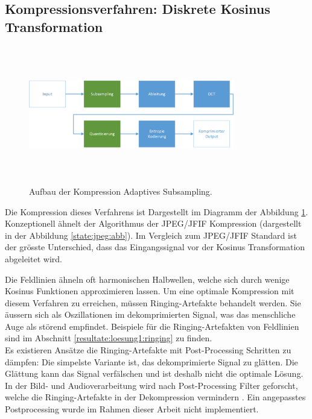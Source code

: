 \subsection{Kompressionsverfahren: Diskrete Kosinus Transformation}\label{konzept:loesung1}
\begin{figure}[!htbp]
	\center
	\includegraphics[width=0.8\textwidth,height=6cm,keepaspectratio]{./pictures/konzept/solution1/aufbau.png}
	\caption{Aufbau der Kompression Adaptives Subsampling.}
	\label{konzept:loesung1:aufbau}
\end{figure} 
Die Kompression dieses Verfahrens ist Dargestellt im Diagramm der Abbildung \ref{konzept:loesung1:aufbau}. Konzeptionell ähnelt der Algorithmus der JPEG/JFIF Kompression (dargestellt in der Abbildung \ref{state:jpeg:abb}). Im Vergleich zum JPEG/JFIF Standard ist der grösste Unterschied, dass das Eingangssignal vor der Kosinus Transformation abgeleitet wird.

Die Feldlinien ähneln oft harmonischen Halbwellen, welche sich durch wenige Kosinus Funktionen approximieren lassen. Um eine optimale Kompression mit diesem Verfahren zu erreichen, müssen Ringing-Artefakte \cite{wiki:ringing:artefacts} behandelt werden. Sie äussern sich als Oszillationen im dekomprimierten Signal, was das menschliche Auge als störend empfindet. Beispiele für die Ringing-Artefakten von Feldlinien sind im Abschnitt \ref{resultate:loesung1:ringing} zu finden.\\
Es existieren Ansätze die Ringing-Artefakte mit Post-Processing Schritten zu dämpfen: Die simpelste Variante ist, das dekomprimierte Signal zu glätten. Die Glättung kann das Signal verfälschen und ist deshalb nicht die optimale Lösung. In der Bild- und Audioverarbeitung wird nach Post-Processing Filter geforscht, welche die Ringing-Artefakte in der Dekompression vermindern \cite{kaup1998reduction} \cite{park1999postprocessing}. Ein angepasstes Postprocessing wurde im Rahmen dieser Arbeit nicht implementiert.

